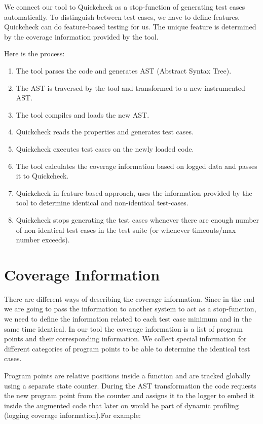 \documentclass[12pt,a4paper]{report}
\begin{document}
We connect our tool to Quickcheck as a stop-function of generating test cases automatically. To distinguish between test cases, we have to define features.
 Quickcheck can do feature-based testing for us. The unique feature is determined by the coverage information provided by the tool.

Here is the process:
\begin{enumerate}
 \item The tool parses the code and generates AST (Abstract Syntax Tree).
 \item The AST is traversed by the tool and transformed to a new instrumented AST.
 \item The tool compiles and loads the new AST.
 \item Quickcheck reads the properties and generates test cases.
 \item Quickcheck executes test cases on the newly loaded code.
 \item The tool calculates the coverage information based on logged data and passes it to Quickcheck.
 \item Quickcheck in feature-based approach, uses the information provided by the tool to determine identical and non-identical test-cases.
 \item Quickcheck stops generating the test cases whenever there are enough number of non-identical test cases in the test suite (or 
whenever timeouts/max number exceeds).
\end{enumerate}

\section{Coverage Information}
There are different ways of describing the coverage information. Since in the end we are going to pass the information to another system to act as a stop-function, we need to
 define the information related to each test case minimum and in the same time identical. In our tool the coverage information is a list of program points and their
 corresponding information. We collect special information for different categories of program points to be able to determine the identical test cases.

Program points are relative positions inside a function and are tracked globally using a separate state counter. During the AST transformation the code requests the new
 program point from the counter and assigns it to the logger to embed it inside the augmented code that later on would be part of dynamic profiling (logging coverage
 information).For example:
\end{document}
